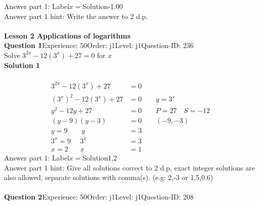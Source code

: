 \documentclass{article}
\begin{document}
Answer part 1: \hspace{10pt}Label\hspace{10pt}$x=$\hspace{10pt}Solution\hspace{10pt}-1.00\\
Answer part 1 hint: \hspace{15pt}Write the answer to 2 d.p.\\
\\[4pt]
\noindent\huge{\textbf{Lesson 2 Applications of logarithms}}\\[12pt]
\noindent\textbf{Question 1}\hspace{20pt}Experience: 50\hspace{20pt}Order: j1\hspace{20pt}Level: j1\hspace{20pt}Question-ID: 236\\[2pt]
Solve $3^{2x}-12(3^x)+27=0$ for $x$\\[4pt]
\noindent\textbf{Solution 1}\\[2pt]
\\[-35pt]\begin{align*}
3^{2x}-12(3^x)+27&=0\\[2pt]
(3^x)^2-12(3^x)+27&=0\qquad y=3^x\\[2pt]
y^2-12y+27&=0\qquad P=27 \quad S=-12\\[2pt]
(y-9)(y-3)&=0\qquad (-9,-3)\\[2pt]
y=9 \qquad y&=3\\[2pt]
3^x=9\hspace{16pt} 3^x&=3\\[2pt]
x=2 \hspace{21pt} x&=1
\end{align*}
Answer part 1: \hspace{10pt}Label\hspace{10pt}$x=$\hspace{10pt}Solution\hspace{10pt}1,2\\
Answer part 1 hint: \hspace{15pt}Give all solutions correct to 2 d.p, exact integer solutions are also allowed, separate solutions with comma(s).  (e.g:  2,-3 or 1.5,0.6)  \\
\\[4pt]
\noindent\textbf{Question 2}\hspace{20pt}Experience: 50\hspace{20pt}Order: j1\hspace{20pt}Level: j1\hspace{20pt}Question-ID: 208\\[2pt]
\end{document}
